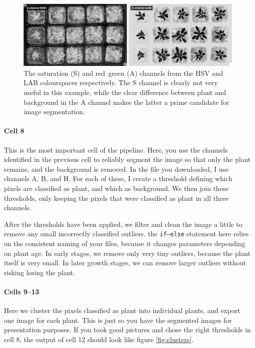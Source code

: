 \documentclass[10pt]{article}
\begin{document}
\begin{figure}[!h]
	\centering
	\includegraphics[width=0.95\linewidth]{S_A}
	\caption[S and A channels.]{The saturation (S) and red--green (A) channels from the HSV and LAB colourspaces respectively. The S channel is clearly not very useful in this example, while the clear difference between plant and background in the A channel makes the latter a prime candidate for image segmentation.}
	\label{fig:S_A}
\end{figure}

\paragraph*{Cell 8} This is the most important cell of the pipeline. Here, you use the channels identified in the previous cell to reliably segment the image so that only the plant remains, and the background is removed. In the file you downloaded, I use channels A, B, and H. For each of these, I create a threshold defining which pixels are classified as plant, and which as background. We then join these thresholds, only keeping the pixels that were classified as plant in all three channels.

After the thresholds have been applied, we filter and clean the image a little to remove any small incorrectly classified outliers. the \texttt{if--else} statement here relies on the consistent naming of your files, because it changes parameters depending on plant age. In early stages, we remove only very tiny outliers, because the plant itself is very small. In later growth stages, we can remove larger outliers without risking losing the plant.

\paragraph*{Cells 9--13} Here we cluster the pixels classified as plant into individual plants, and export one image for each plant. This is just so you have the segmented images for presentation purposes. If you took good pictures and chose the right thresholds in cell 8, the output of cell 12 should look like figure \ref{fig:clusters}.
\end{document}
